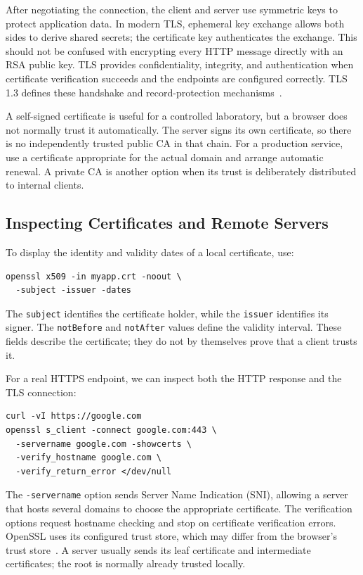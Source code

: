 \documentclass[journal]{IEEEtran}
\begin{document}
After negotiating the connection, the client and server use symmetric keys to protect application data. In modern TLS, ephemeral key exchange allows both sides to derive shared secrets; the certificate key authenticates the exchange. This should not be confused with encrypting every HTTP message directly with an RSA public key. TLS provides confidentiality, integrity, and authentication when certificate verification succeeds and the endpoints are configured correctly. TLS 1.3 defines these handshake and record-protection mechanisms~\cite{tls13}.

A self-signed certificate is useful for a controlled laboratory, but a browser does not normally trust it automatically. The server signs its own certificate, so there is no independently trusted public CA in that chain. For a production service, use a certificate appropriate for the actual domain and arrange automatic renewal. A private CA is another option when its trust is deliberately distributed to internal clients.

\subsection{Inspecting Certificates and Remote Servers}
To display the identity and validity dates of a local certificate, use:
\begin{lstlisting}
openssl x509 -in myapp.crt -noout \
  -subject -issuer -dates
\end{lstlisting}
The \texttt{subject} identifies the certificate holder, while the \texttt{issuer} identifies its signer. The \texttt{notBefore} and \texttt{notAfter} values define the validity interval. These fields describe the certificate; they do not by themselves prove that a client trusts it.

For a real HTTPS endpoint, we can inspect both the HTTP response and the TLS connection:
\begin{lstlisting}
curl -vI https://google.com
openssl s_client -connect google.com:443 \
  -servername google.com -showcerts \
  -verify_hostname google.com \
  -verify_return_error </dev/null
\end{lstlisting}
The \texttt{-servername} option sends Server Name Indication (SNI), allowing a server that hosts several domains to choose the appropriate certificate. The verification options request hostname checking and stop on certificate verification errors. OpenSSL uses its configured trust store, which may differ from the browser's trust store~\cite{opensslclient}. A server usually sends its leaf certificate and intermediate certificates; the root is normally already trusted locally.
\end{document}
